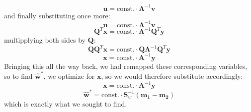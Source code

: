 \documentclass{article}
\begin{document}
{\[
  \mathbf{u} = \text{const.} \cdot \mathbf{\Lambda}^{-1} \mathbf{v}
\]
and finally substituting once more:
\[
  \mathbf{u} = \text{const.} \cdot \mathbf{\Lambda}^{-1} \mathbf{v}
\]
\[
  \mathbf{Q}^T \mathbf{x} = \text{const.} \cdot \mathbf{\Lambda}^{-1} \mathbf{Q}^T \mathbf{y}
\]
multipplying both sides by \(\mathbf{Q}\):
\[
  \mathbf{Q} \mathbf{Q}^T \mathbf{x} = \text{const.} \cdot \mathbf{Q} \mathbf{\Lambda}^{-1} \mathbf{Q}^T \mathbf{y}
\]
\[
  \mathbf{x} = \text{const.} \cdot \mathbf{A}^{-1} \mathbf{y}
\]
Bringing this all the way back, we had remapped these corresponding variables, so to find \(\hat{\mathbf{w}}^*\), we optimize for \(\mathbf{x}\), so we would therefore substitute accordingly:
\[
  \mathbf{x} = \text{const.} \cdot \mathbf{A}^{-1} \mathbf{y}
\]
\[
  \hat{\mathbf{w}}^* = \text{const.} \cdot \mathbf{S}_w^{-1} (\mathbf{m_1} - \mathbf{m_2})
\]
which is exactly what we sought to find. 

}
\end{document}
